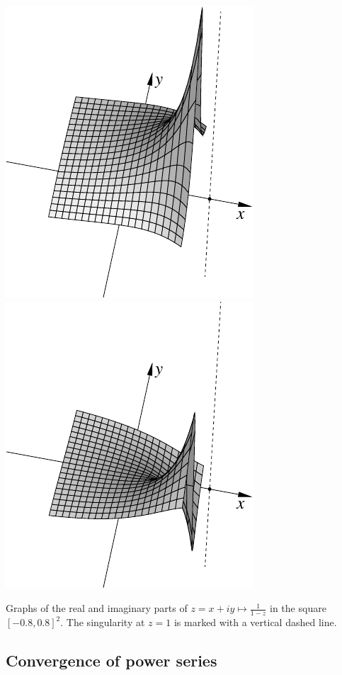 \begin{myfigureht}
\includegraphics{figures/real1over1mz}
\qquad
\includegraphics{figures/imag1over1mz}
\caption{Graphs of the real and imaginary parts of $z=x+iy \mapsto \frac{1}{1-z}$
in the square $[-0.8,0.8]^2$.  The singularity at $z=1$ is marked with a
vertical dashed line.\label{fig:1over1mz}}
\end{myfigureht}

\subsection{Convergence of power series}

